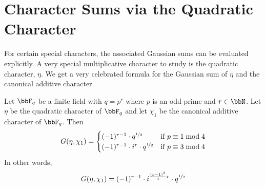 \section{Character Sums via the Quadratic Character}
For certain special characters, the associated Gaussian sums can be evaluated explicitly. A very special multiplicative character to study is the quadratic character, $\eta$. We get a very celebrated formula for the Gaussian sum of $\eta$ and the canonical additive character. 
\begin{Theorem}{}{}
  Let $\bbF_q$ be a finite field with $q=p^r$ where $p$ is an odd prime and $r\in\bbN$. Let $\eta$ be the quadratic character of $\bbF_q$ and let $\chi_1$ be the canonical additive character of $\bbF_q$. Then $$G(\eta,\chi_1)=\begin{cases}
    (-1)^{r-1}\cdot q^{\nicefrac12} & \text{if }p\equiv 1\bmod 4\\ 
    (-1)^{r-1}\cdot i^{r}\cdot q^{\nicefrac12} & \text{if }p\equiv 3\bmod 4    
  \end{cases}$$
  In other words, $$G(\eta,\chi_1)=(-1)^{r-1}\cdot i^{\frac{(p-1)^2}4 r} \cdot q^{\nicefrac12}$$ 
\end{Theorem}
